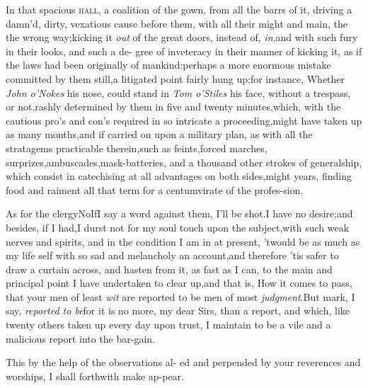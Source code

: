 \documentclass{article}
\begin{document}
In that spacious \textsc{hall}, a coalition of the gown, from all the
barrs of it, driving a damn’d, dirty, vexatious cause before them, with
all their might and main, the the wrong way;\tsh kicking it \textit{out} of
the great doors, instead of, \textit{in},\tsh and with such fury in their
looks, and such a de- gree of inveteracy in
their manner of\break
kicking it, as if the
laws had been originally  of
mankind:\tsk perhaps a more enormous mistake committed by them
still,\tsk a li\-tigated point fairly hung up;\tsk for in\-stance,
Whether \textit{John o’\thinspace Nokes} his nose, could stand in \textit{Tom
o’\thinspace Stiles} his face, without a trespass, or not,\tsk rashly
determin\-ed by them in five and twenty minutes,\break which,
with the cautious pro’s and con’s required in so intricate a
proceeding,\break might have taken up as many months,\tsk and if
carried on upon a military plan, as  with all the stratagems practicable
there\-in,\tsk such as feints,\tsk forced marches,\tsk
surprizes,\tsk ambuscades,\tsk mask-batte\-ries, and a thousand
other strokes of generalship, which consist in catechising at all
advantages on both sides,\tsh might
 years, finding food and raiment all that term for a
centumvirate of the profes-\break sion.


As for the clergy\tsh\!\tsh No\tsh If\break I say a word against them, I’ll be
shot.\tsh I have no desire;\tsk and besides, if I had,\break \tsk I durst not for my
soul touch upon the subject,\tsh with such weak nerves and spirits, and in the
condition I am in at present, ’twould be as much as my life  self with so sad and melancholy an account,\tsk and therefore ’tis
safer to draw a curtain across, and hasten from it, as fast as I can, to the main
and principal point I have undertaken to clear up,\tsh and that is, How it comes to
pass, that your men of least \textit{wit} are reported to be men of most
\textit{judgment}.\tsh But mark,\tsk{}
I say, \textit{reported to be}\tsk for it is no more, my dear
Sirs, than a report, and which,\break
like twenty others taken up every\break
day upon trust, I maintain to be a vile\break
and a malicious report into the bar-\break gain.

This by the help of the observations al-\break
{}\break
ed and perpended by your reverences and\break
worships, I shall forthwith make ap-\break pear.
\end{document}
